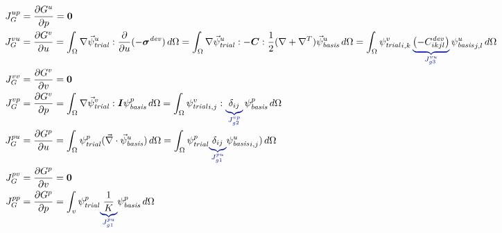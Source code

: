 \begin{align}
  J_G^{up} &= \frac{\partial G^u}{\partial p} = \tensor{0} \\
%
  J_G^{vu} &= \frac{\partial G^v}{\partial u} = \int_\Omega \nabla \trialvec[u] : 
\frac{\partial}{\partial u}(-
\tensor{\sigma}^\mathit{dev}) \, d\Omega 
  = \int_\Omega \nabla \trialvec[u] : -\tensor{C} : \frac{1}{2}(\nabla + \nabla^T)\basisvec[u] 
\, d\Omega 
  = \int_\Omega \trialscalar[v]_{i,k} \, \eqnannotate{\left(-C^\mathit{dev}_{ikjl}\right)}
{J_{g3}^{vu}}  \, 
\basisscalar[u]_{j,l}\, d\Omega \\
  J_G^{vv} &= \frac{\partial G^v}{\partial v} = \tensor{0} \\
  J_G^{vp} &= \frac{\partial G^v}{\partial p} = \int_\Omega \nabla\trialvec[v] : \tensor{I} 
\basisscalar[p] \, 
d\Omega = \int_\Omega \trialscalar[v]_{i,j} : \eqnannotate{\delta_{ij}}{J_{g2}^{vp}} \, 
\basisscalar[p] \, d\Omega 
\\
%
  J_G^{pu} &= \frac{\partial G^p}{\partial u} = \int_\Omega \trialscalar[p] (\vec{\nabla} 
\cdot \basisvec[u]) \, 
d\Omega = \int_\Omega \trialscalar[p] \eqnannotate{\delta_{ij}}{J_{g1}^{pu}} 
\basisscalar[u]_{i,j}) \, d\Omega\\
  J_G^{pv} &= \frac{\partial G^p}{\partial v} = \tensor{0} \\
  J_G^{pp} &= \frac{\partial G^p}{\partial p} = \int_v \trialscalar[p] \eqnannotate{\frac{1}
{K}}{J_{g1}^{pu}} 
\basisscalar[p] \, d\Omega
\end{align}


